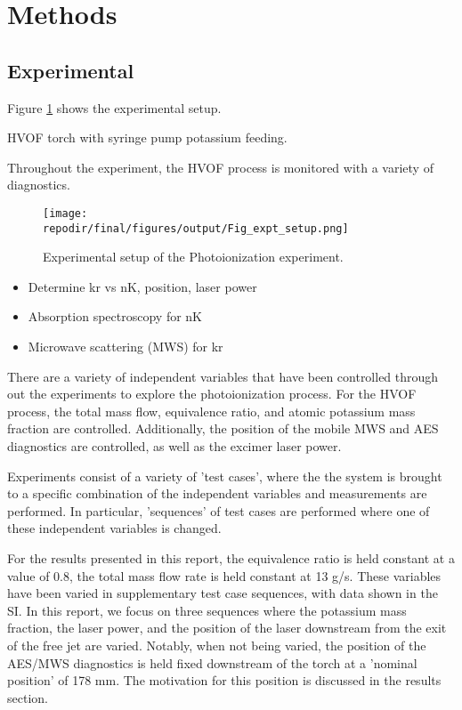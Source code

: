 \section{Methods}


\subsection{Experimental}

Figure \ref{fig:expt_setup} shows the experimental setup. 

HVOF torch with syringe pump potassium feeding. 

Throughout the experiment, the HVOF process is monitored with a variety of diagnostics. 



\begin{figure}[h]
    \texttt{[image: \\repodir/final/figures/output/Fig\_expt\_setup.png]} 
    \caption{Experimental setup of the Photoionization experiment. }
    \label{fig:expt_setup}
\end{figure}

\begin{itemize}
\item Determine kr vs nK, position, laser power
\item Absorption spectroscopy for nK
\item Microwave scattering (MWS) for kr 
\end{itemize}


There are a variety of independent variables that have been controlled through out the experiments to explore the photoionization process. For the HVOF process, the total mass flow, equivalence ratio, and atomic potassium mass fraction are controlled. Additionally, the position of the mobile MWS and AES diagnostics are controlled, as well as the excimer laser power. 

Experiments consist of a variety of 'test cases', where the the system is brought to a specific combination of the independent variables and measurements are performed. In particular, 'sequences' of test cases are performed where one of these independent variables is changed. 

For the results presented in this report, the equivalence ratio is held constant at a value of 0.8, the total mass flow rate is held constant at 13 g/s. These variables have been varied in supplementary test case sequences, with data shown in the SI. In this report, we focus on three sequences where the potassium mass fraction, the laser power, and the position of the laser downstream from the exit of the free jet are varied. Notably, when not being varied, the position of the AES/MWS diagnostics is held fixed downstream of the torch at a 'nominal position' of 178 mm. The motivation for this position is discussed in the results section. 

